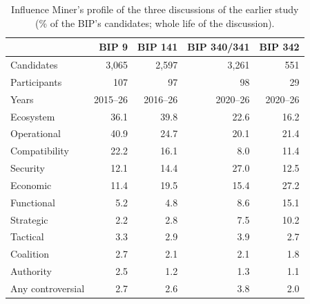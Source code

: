 \begin{table}[t]
\caption{Influence Miner's profile of the three discussions of the earlier study (\% of the BIP's candidates; whole life of the discussion).}
\label{tab:icisbips}
\footnotesize
\setlength{\tabcolsep}{3.5pt}
\begin{tabular}{lrrrr}
\toprule
 & BIP 9 & BIP 141 & BIP 340/341 & BIP 342 \\
\midrule
Candidates & 3,065 & 2,597 & 3,261 & 551 \\
Participants & 107 & 97 & 98 & 29 \\
Years & 2015--26 & 2016--26 & 2020--26 & 2020--26 \\
\midrule
Ecosystem & 36.1 & 39.8 & 22.6 & 16.2 \\
Operational & 40.9 & 24.7 & 20.1 & 21.4 \\
Compatibility & 22.2 & 16.1 & 8.0 & 11.4 \\
Security & 12.1 & 14.4 & 27.0 & 12.5 \\
Economic & 11.4 & 19.5 & 15.4 & 27.2 \\
Functional & 5.2 & 4.8 & 8.6 & 15.1 \\
Strategic & 2.2 & 2.8 & 7.5 & 10.2 \\
Tactical & 3.3 & 2.9 & 3.9 & 2.7 \\
Coalition & 2.7 & 2.1 & 2.1 & 1.8 \\
Authority & 2.5 & 1.2 & 1.3 & 1.1 \\
Any controversial & 2.7 & 2.6 & 3.8 & 2.0 \\
\bottomrule
\end{tabular}
\end{table}

